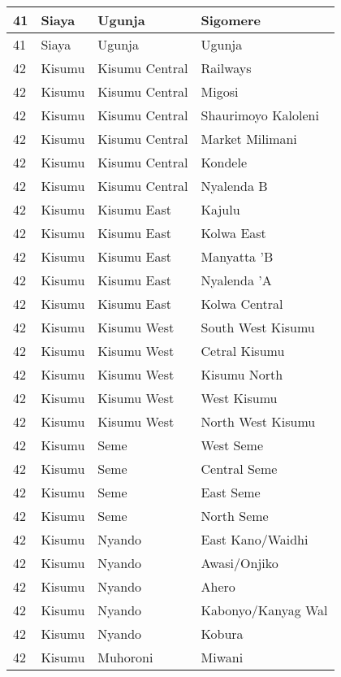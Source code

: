 \begin{table}[!ht]
\begin{tabular}{|l|l|l|l|}
        41 & Siaya & Ugunja & Sigomere \\ \hline
        41 & Siaya & Ugunja & Ugunja \\ \hline
        42 & Kisumu & Kisumu Central & Railways \\ \hline
        42 & Kisumu & Kisumu Central & Migosi \\ \hline
        42 & Kisumu & Kisumu Central & Shaurimoyo Kaloleni \\ \hline
        42 & Kisumu & Kisumu Central & Market Milimani \\ \hline
        42 & Kisumu & Kisumu Central & Kondele \\ \hline
        42 & Kisumu & Kisumu Central & Nyalenda B \\ \hline
        42 & Kisumu & Kisumu East & Kajulu \\ \hline
        42 & Kisumu & Kisumu East & Kolwa East \\ \hline
        42 & Kisumu & Kisumu East & Manyatta ’B \\ \hline
        42 & Kisumu & Kisumu East & Nyalenda ’A \\ \hline
        42 & Kisumu & Kisumu East & Kolwa Central \\ \hline
        42 & Kisumu & Kisumu West & South West Kisumu \\ \hline
        42 & Kisumu & Kisumu West & Cetral Kisumu \\ \hline
        42 & Kisumu & Kisumu West & Kisumu North \\ \hline
        42 & Kisumu & Kisumu West & West Kisumu \\ \hline
        42 & Kisumu & Kisumu West & North West Kisumu \\ \hline
        42 & Kisumu & Seme & West Seme \\ \hline
        42 & Kisumu & Seme & Central Seme \\ \hline
        42 & Kisumu & Seme & East Seme \\ \hline
        42 & Kisumu & Seme & North Seme \\ \hline
        42 & Kisumu & Nyando & East Kano/Waidhi \\ \hline
        42 & Kisumu & Nyando & Awasi/Onjiko \\ \hline
        42 & Kisumu & Nyando & Ahero \\ \hline
        42 & Kisumu & Nyando & Kabonyo/Kanyag Wal \\ \hline
        42 & Kisumu & Nyando & Kobura \\ \hline
        42 & Kisumu & Muhoroni & Miwani \\ \hline

\end{tabular}
\end{table}
